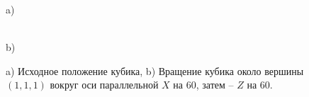 \documentclass[a5paper, 10pt]{article}
\theoremstyle{definition}
\theoremstyle{plain}
\theoremstyle{remark}
\begin{document}
\begin{figure}[h!]
\begin{minipage}[h]{0.47\linewidth}
 a) \\
\end{minipage}
\hfill
\begin{minipage}[h]{0.47\linewidth}
 \\b)
\end{minipage}
\caption{a) Исходное положение кубика, b) Вращение кубика около вершины $(1, 1, 1)$ вокруг оси параллельной $X$ на 60\textdegree, затем -- $Z$ на 60\textdegree.}

\end{figure}
\end{document}
